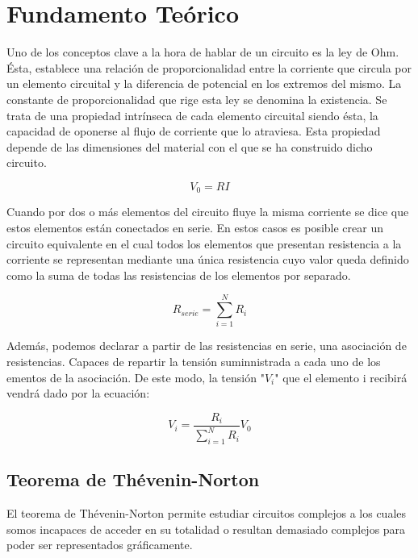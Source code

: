 \documentclass[a4paper,11pt]{article}
\begin{document}
\newpage
\section{Fundamento Teórico}
Uno de los conceptos clave a la hora de hablar de un circuito es la ley de Ohm. Ésta, establece una relación de proporcionalidad entre la corriente que circula por un elemento circuital y la diferencia de potencial en los extremos del mismo. La constante de proporcionalidad que rige esta ley se denomina la existencia. Se trata de una propiedad intrínseca de cada elemento circuital siendo ésta, la capacidad de oponerse al flujo de corriente que lo atraviesa. Esta propiedad depende de las dimensiones del material con el que se ha construido dicho circuito.

\begin{displaymath}
V_{0}=RI
\end{displaymath}

Cuando por dos o más elementos del circuito fluye la misma corriente se dice que estos elementos están conectados en serie. En estos casos es posible crear un circuito equivalente en el cual todos los elementos que presentan resistencia a la corriente se representan mediante una única resistencia cuyo valor queda definido como la suma de todas las resistencias de los elementos por separado.

\begin{displaymath}
R_{serie}=\sum_{i=1}^N R_{i}
\end{displaymath}

Además, podemos declarar a partir de las resistencias en serie, una asociación de resistencias. Capaces de repartir la tensión suminnistrada a cada uno de los ementos de la asociación. De este modo, la tensión "$V_i$" que el elemento i recibirá vendrá dado por la ecuación:

\begin{displaymath}
V_i=\frac{R_i}{\sum_{i=1}^N R_{i}}V_0
\end{displaymath}

\subsection{Teorema de Thévenin-Norton}
El teorema de Thévenin-Norton permite estudiar circuitos complejos a los cuales somos incapaces de acceder en su totalidad o resultan demasiado complejos para poder ser representados gráficamente.\\ \\
\end{document}
